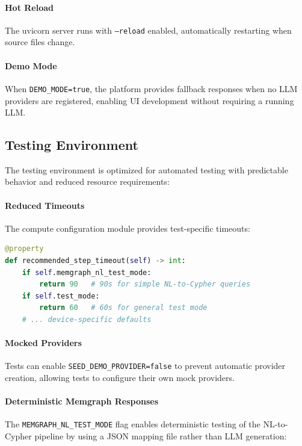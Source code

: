 \paragraph{Hot Reload}
The uvicorn server runs with \texttt{--reload} enabled, automatically restarting when source files change.

\paragraph{Demo Mode}
When \texttt{DEMO\_MODE=true}, the platform provides fallback responses when no LLM providers are registered, enabling UI development without requiring a running LLM.

\subsection{Testing Environment}

The testing environment is optimized for automated testing with predictable behavior and reduced resource requirements:

\paragraph{Reduced Timeouts}
The compute configuration module provides test-specific timeouts:

\begin{lstlisting}[language=Python, caption=Test mode timeout configuration]
@property
def recommended_step_timeout(self) -> int:
    if self.memgraph_nl_test_mode:
        return 90   # 90s for simple NL-to-Cypher queries
    if self.test_mode:
        return 60   # 60s for general test mode
    # ... device-specific defaults
\end{lstlisting}

\paragraph{Mocked Providers}
Tests can enable \texttt{SEED\_DEMO\_PROVIDER=false} to prevent automatic provider creation, allowing tests to configure their own mock providers.

\paragraph{Deterministic Memgraph Responses}
The \texttt{MEMGRAPH\_NL\_TEST\_MODE} flag enables deterministic testing of the NL-to-Cypher pipeline by using a JSON mapping file rather than LLM generation:

